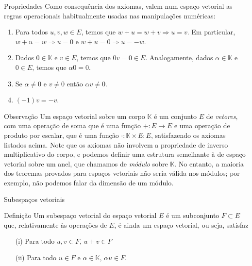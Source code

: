 \documentclass{beamer}
\begin{document}
\begin{darkframes}
\begin{frame}{Propriedades}
Como consequência dos axiomas, valem num espaço vetorial as regras operacionais habitualmente usadas nas manipulações numéricas:
\begin{enumerate}
\item Para todos $u,v,w \in E$, temos que $w+u = w+v \Rightarrow u=v$. Em particular, $w+u = w \Rightarrow u=0$ e $w+u = 0 \Rightarrow u=-w$.
\item Dados $0\in {\mathbb{K}}$ e $v\in E$, temos que $0v = 0 \in E$. Analogamente, dados $\alpha \in {\mathbb{K}}$ e $0\in E$, temos que $\alpha 0 = 0$.
\item Se $\alpha \ne 0$ e $v\ne 0$ então $\alpha v \ne 0$.
\item $(-1)v = -v$.
\end{enumerate}
\end{frame}

\begin{frame}{Observação}
Um espaço vetorial sobre um corpo ${\mathbb{K}}$ é um conjunto $E$ de \emph{vetores}, com uma operação de soma que é uma função $+:E\to E$ e uma operação de produto por escalar, que é uma função $\cdot: {\mathbb{K}}\times E:E$, satisfazendo os axiomas listados acima. Note que os axiomas não involvem a propriedade de inverso multiplicativo do corpo, e podemos definir uma estrutura semelhante à de espaço vetorial sobre um anel, que chamamos de \emph{módulo} sobre ${\mathbb{K}}$. No entanto, a maioria dos teoremas provados para espaços vetoriais não seria válida nos módulos; por exemplo, não podemos falar da dimensão de um módulo.
\end{frame}

\begin{frame}{Subespaços vetoriais}

\begin{block}{Definição}
  Um subespaço vetorial do espaço vetorial $E$ é um subconjunto $F\subset E$ que, relativamente às operações de $E$, é ainda um espaço vetorial, ou seja, satisfaz 
  \begin{itemize}
  \item[(i)] Para todo $u,v \in F$, $u+v \in F$
  \item[(ii)] Para todo $u\in F$ e $\alpha \in {\mathbb{K}}$, $\alpha u \in F$.
  \end{itemize}
\end{block}
\end{frame}


\end{darkframes}
\end{document}
